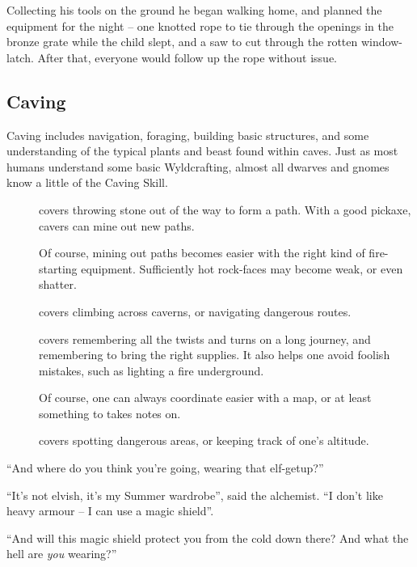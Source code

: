 \begin{multicols}{2}
\begin{exampletext}
  Collecting his tools on the ground he began walking home, and planned the equipment for the night -- one knotted rope to tie through the openings in the bronze grate while the child slept, and a saw to cut through the rotten window-latch.
  After that, everyone would follow up the rope without issue.
\end{exampletext}

\subsection{Caving}

Caving includes navigation, foraging, building basic structures, and some understanding of the typical plants and beast found within caves.
Just as most humans understand some basic Wyldcrafting, almost all dwarves and gnomes know a little of the Caving Skill.


\begin{description}
  \item[]
    covers throwing stone out of the way to form a path.
    With a good pickaxe, cavers can mine out new paths.

    Of course, mining out paths becomes easier with the right kind of fire-starting equipment.
    Sufficiently hot rock-faces may become weak, or even shatter.
  \item[]
    covers climbing across caverns, or navigating dangerous routes.
  \item[]
    covers remembering all the twists and turns on a long journey, and remembering to bring the right supplies.
    It also helps one avoid foolish mistakes, such as lighting a fire underground.

    Of course, one can always coordinate easier with a map, or at least something to takes notes on.
  \item[]
    covers spotting dangerous areas, or keeping track of one's altitude.
\end{description}

\begin{exampletext}

  ``And where do you think you're going, wearing that elf-getup?''

  ``It's not elvish, it's my Summer wardrobe'', said the alchemist.
  ``I don't like heavy armour -- I can use a magic shield''.

  ``And will this magic shield protect you from the cold down there?
  And what the hell are \emph{you} wearing?''


\end{exampletext}
\end{multicols}
